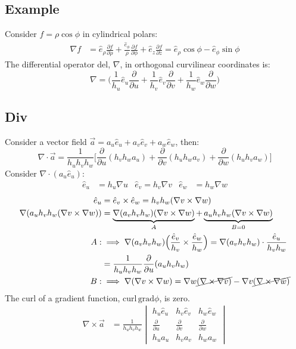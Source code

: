 \documentclass[a4paper, 11pt, normalem]{report}
\newcommand\p{\partial}
\newcommand\va{\vec{a}}
\newcommand\he{\hat{e}}
\begin{document}
\subsection{Example}
Consider $f = \rho\cos\phi$ in cylindrical polars:
\begin{align*}
    \nabla f &= \hat{e}_\rho \frac{\p f}{\p \rho} + \frac{\hat{e}_\phi}{\rho} \frac{\p f}{\p \phi} + \hat{e}_z \frac{\p f}{\p z} = \hat{e}_\rho \cos\phi - \hat{e}_\phi \sin\phi
\end{align*}
The differential operator del, $\nabla$, in orthogonal curvilinear coordinates is:
\begin{equation*}
    \nabla = \Big(\frac{1}{h_u}\hat{e}_u \frac{\p}{\p u} + \frac{1}{h_v} \hat{e}_v \frac{\p}{\p v} + \frac{1}{h_w}\hat{e}_w \frac{\p}{\p w}\Big)
\end{equation*}

\subsection{Div}
Consider a vector field $\va = a_u \hat{e}_u + a_v\he_v + a_w\he_w$, then:
\begin{equation*}
    \nabla \cdot \va = \frac{1}{h_u h_v h_w}\Bigg[\frac{\p}{\p u}(h_v h_w a_u) + \frac{\p}{\p v}(h_u h_w a_v) + \frac{\p}{\p w}(h_u h_v a_w)\Bigg]
\end{equation*}
Consider $\nabla \cdot (a_u \he_u)$:
\begin{align*}
    \he_u &= h_u \nabla u & \he_v = h_v \nabla v & \he_w &= h_w \nabla w
\end{align*}
\begin{align*}
    \he_u &= \he_v \times \he_w = h_vh_w (\nabla v \times \nabla w) \\
    \nabla (a_u h_v h_w (\nabla v \times \nabla w)) &= \underbrace{\nabla(a_v h_v h_w)(\nabla v \times \nabla w)}_{A} + \underbrace{a_u h_v h_w (\nabla v \times \nabla w)}_{B = 0} \\
    A: &\implies \nabla (a_v h_v h_w)\Big(\frac{\he_v}{h_v} \times \frac{\he_w}{h_w}\Big) = \nabla (a_v h_v h_w)\cdot \frac{\he_u}{h_v h_w} \\
    &= \frac{1}{h_u h_v h_w}\frac{\p}{\p u}(a_u h_v h_w) \\
    B: &\implies \nabla (\nabla v \times \nabla w) = \nabla w \cancel{(\nabla \times \nabla v)} - \nabla v \cancel{(\nabla \times \nabla w)}
\end{align*}
The curl of a gradient function, $\text{curl}\,\text{grad}\phi$, is zero.
\begin{align*}
    \nabla \times \va &= \frac{1}{h_u h_v h_w} \begin{vmatrix} h_u \he_u & h_v\he_v & h_w\he_w \\ \frac{\p}{\p u} & \frac{\p}{\p v} & \frac{\p}{\p w} \\ h_u a_u & h_v a_v & h_w a_w \end{vmatrix}
\end{align*}


\end{document}
